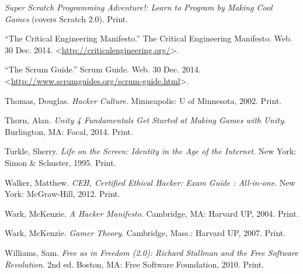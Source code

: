\documentclass[letterpaper,10pt,english]{sphinxmanual}
\begin{document}
\emph{Super Scratch Programming Adventure!: Learn to Program by Making Cool Games} (covers Scratch 2.0). Print.

``The Critical Engineering Manifesto.'' The Critical Engineering Manifesto. Web. 30 Dec. 2014. \textless{}\href{http://criticalengineering.org/}{http://criticalengineering.org/}\textgreater{}.

``The Scrum Guide.'' Scrum Guide. Web. 30 Dec. 2014. \textless{}\href{http://www.scrumguides.org/scrum-guide.html}{http://www.scrumguides.org/scrum-guide.html}\textgreater{}.

Thomas, Douglas. \emph{Hacker Culture}. Minneapolis: U of Minnesota, 2002.
Print.

Thorn, Alan. \emph{Unity 4 Fundamentals Get Started at Making Games with Unity}. Burlington, MA: Focal, 2014. Print.

Turkle, Sherry. \emph{Life on the Screen: Identity in the Age of the Internet}. New York: Simon \& Schuster, 1995. Print.

Walker, Matthew. \emph{CEH, Certified Ethical Hacker: Exam Guide : All-in-one}. New York: McGraw-Hill, 2012. Print.

Wark, McKenzie. \emph{A Hacker Manifesto}. Cambridge, MA: Harvard UP, 2004. Print.

Wark, McKenzie. \emph{Gamer Theory}. Cambridge, Mass.: Harvard UP, 2007. Print.

Williams, Sam. \emph{Free as in Freedom (2.0): Richard Stallman and the Free Software Revolution}. 2nd ed. Boston, MA: Free Software Foundation, 2010. Print.



\renewcommand{\indexname}{Index}
\printindex
\end{document}
